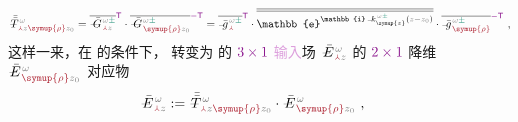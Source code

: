 \begin{align} \label{eq:transition_matrix-transverse_input}
	\Xint{\mathcolor{gray}{-}}{32}{\bar{\bar{T}}}^{\;\!\mathcolor{gray}{\omega}}_{\;\! \textcolor{Maroon}{\Yup} \mathcolor{gray}{z} \textcolor{Maroon}{\symup{\rho}} \mathcolor{gray}{z_0}} = \overline{\Xint{\mathcolor{gray}{-}}{20}{\bar{G}}^{\;\!\mathcolor{gray}{\omega} \textcolor{PineGreen}{\pm}}_{\;\! \textcolor{Maroon}{\Yup} \mathcolor{gray}{z}}}^{\mathsf{\textcolor{Plum}{T}}} \cdot \overline{\Xint{\mathcolor{gray}{-}}{20}{\bar{G}}^{\;\!\mathcolor{gray}{\omega} \textcolor{PineGreen}{\pm}}_{\;\! \textcolor{Maroon}{\symup{\rho}} \mathcolor{gray}{z_0}}}^{\textcolor{Plum}{-\mathsf{T}}} = \overline{\Xint{{}^{}_{\mathcolor{gray}{-}}}{10}{\bar{g}}^{\;\!\mathcolor{gray}{\omega} \textcolor{PineGreen}{\pm}}_{\;\! \textcolor{Maroon}{\Yup}}}^{\mathsf{\textcolor{Plum}{T}}} \cdot \overline{\overline{\mathbb{e}^{\mathbb{i} \Xint{\begin{smallmatrix} ~ \\ {}^{}_{\mathcolor{gray}{-}} \\ ~ \end{smallmatrix}}{15}{k}_{\symup{z}}^{\;\! \mathcolor{gray}{\omega} \textcolor{PineGreen}{\pm}} \left( \mathcolor{gray}{z} - \mathcolor{gray}{z_0} \right)}}} \cdot \overline{\Xint{{}^{}_{\mathcolor{gray}{-}}}{10}{\bar{g}}^{\;\!\mathcolor{gray}{\omega} \textcolor{PineGreen}{\pm}}_{\;\! \textcolor{Maroon}{\symup{\rho}}}}^{\textcolor{Plum}{-\mathsf{T}}} ~,
\end{align}
这样一来，在  的条件下， 转变为  的 $\textcolor{Plum}{3 \times 1}$ \textcolor{Plum}{输入}场 $\Xint{\mathcolor{gray}{-}}{25}{\bar{E}}^{\;\!\mathcolor{gray}{\omega}}_{\;\! \textcolor{Maroon}{\Yup} \mathcolor{gray}{z}}$ 的 $\textcolor{Plum}{2 \times 1}$ 降维 $\Xint{\mathcolor{gray}{-}}{25}{\bar{E}}^{\;\!\mathcolor{gray}{\omega}}_{\;\! \textcolor{Maroon}{\symup{\rho}} \mathcolor{gray}{z_0}}$ 对应物
\begin{align} \label{eq:E=transition_matrix-Erho}
	\Xint{\mathcolor{gray}{-}}{30}{\bar{E}}^{\;\!\mathcolor{gray}{\omega}}_{\;\! \textcolor{Maroon}{\Yup} \mathcolor{gray}{z}} &:= \Xint{\mathcolor{gray}{-}}{32}{\bar{\bar{T}}}^{\;\!\mathcolor{gray}{\omega}}_{\;\! \textcolor{Maroon}{\Yup} \mathcolor{gray}{z} \textcolor{Maroon}{\symup{\rho}} \mathcolor{gray}{z_0}} \cdot \Xint{\mathcolor{gray}{-}}{30}{\bar{E}}^{\;\!\mathcolor{gray}{\omega}}_{\;\! \textcolor{Maroon}{\symup{\rho}} \mathcolor{gray}{z_0}} ~,
\end{align}
